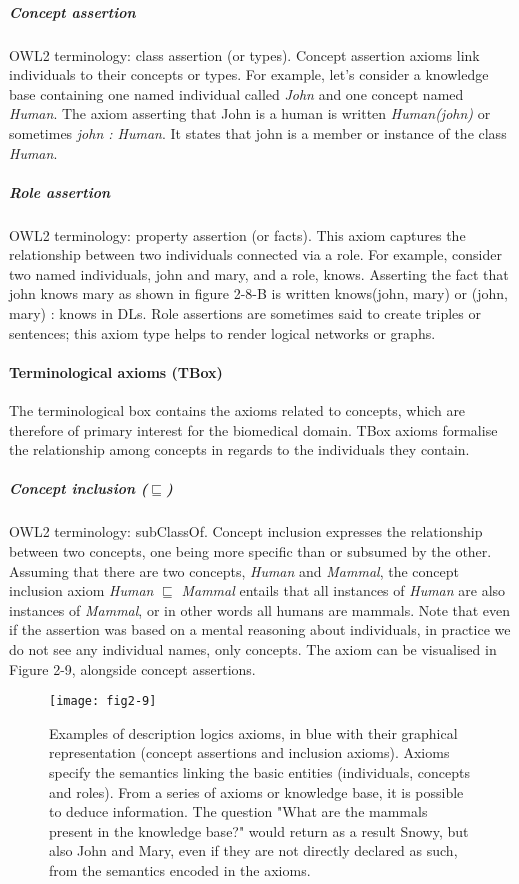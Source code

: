 \subparagraph{Concept assertion\\}
OWL2 terminology: class assertion (or types). Concept assertion axioms link individuals to their concepts or types. For example, let's consider a knowledge base containing one named individual called \emph{John} and one concept named \emph{Human}. The axiom asserting that John is a human is written \emph{Human(john)} or sometimes \emph{john : Human}. It states that john is a member or instance of the class \emph{Human}.

\subparagraph{Role assertion\\}
OWL2 terminology: property assertion (or facts). This axiom captures the relationship between two individuals connected via a role. For example, consider two named individuals, john and mary, and a role, knows. Asserting the fact that john knows mary as shown in figure 2-8-B is written knows(john, mary) or (john, mary) : knows in DLs. Role assertions are sometimes said to create triples or sentences; this axiom type helps to render logical networks or graphs.

\paragraph{\textbf{Terminological axioms (TBox)}\\}

The terminological box contains the axioms related to concepts, which are therefore of primary interest for the biomedical domain. TBox axioms formalise the relationship among concepts in regards to the individuals they contain.

\subparagraph{Concept inclusion ($ \sqsubseteq $)\\}
OWL2 terminology: subClassOf. Concept inclusion expresses the relationship between two concepts, one being more specific than or subsumed by the other. Assuming that there are two concepts, \emph{Human} and \emph{Mammal}, the concept inclusion axiom \emph{Human} $ \sqsubseteq $ \emph{Mammal} entails that all instances of \emph{Human} are also instances of \emph{Mammal}, or in other words all humans are mammals. Note that even if the assertion was based on a mental reasoning about individuals, in practice we do not see any individual names, only concepts. The axiom can be visualised in Figure 2-9, alongside concept assertions.

\begin{figure}[ht]
    \centering
    \texttt{[image: fig2-9]}
    \caption{Examples of description logics axioms, in blue with their graphical representation (concept assertions and inclusion axioms). Axioms specify the semantics linking the basic entities (individuals, concepts and roles). From a series of axioms or knowledge base, it is possible to deduce information. The question "What are the mammals present in the knowledge base?" would return as a result Snowy, but also John and Mary, even if they are not directly declared as such, from the semantics encoded in the axioms.}
    \label{fig2-9}
\end{figure}

